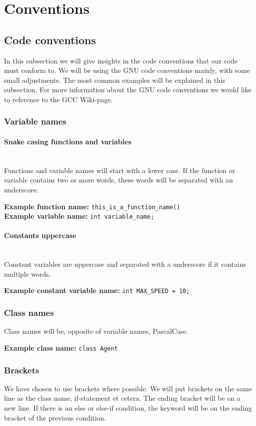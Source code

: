 \section{Conventions}
\subsection{Code conventions}
In this subsection we will give insights in the code conventions that our code must conform to. We will be using the GNU code conventions mainly, with some small adjustments.
The most common examples will be explained in this subsection. For more information about the GNU code conventions we would like to reference to the GCC Wiki-page. \cite{gccwcc}
\subsubsection{Variable names}
\paragraph{Snake casing functions and variables}
~\\Functions and variable names will start with a lower case. If the function or variable contains two or more words, these words will be separated with an underscore.

\textbf{Example function name:} \lstinline{this_is_a_function_name()}
~\\\textbf{Example variable name:} \lstinline{int variable_name;}

\paragraph{Constants uppercase}
~\\Constant variables are uppercase and separated with a underscore if it contains multiple words.

\textbf{Example constant variable name:} \lstinline{int MAX_SPEED = 10;}

\subsubsection{Class names}
Class names will be, opposite of variable names, PascalCase.

\textbf{Example class name:} \lstinline{class Agent}\clearpage

\subsubsection{Brackets}
We have chosen to use brackets where possible. We will put brackets on the same line as the class name, if-statement et cetera. The ending bracket will be on a new line.
If there is an else or else-if condition, the keyword will be on the ending bracket of the previous condition.

